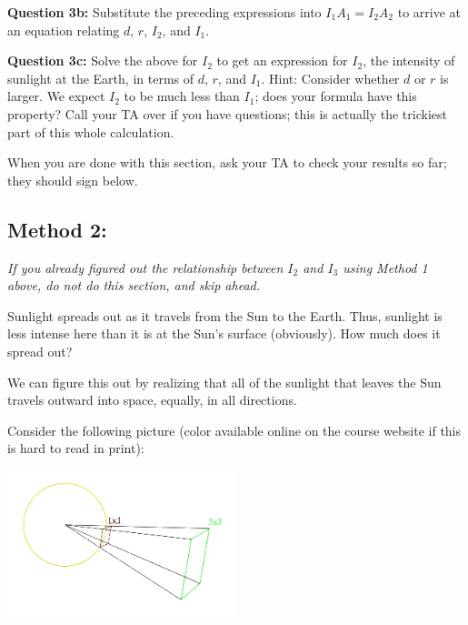 \documentclass[11pt]{article}
\def\BC{\begin{center}}
\def\EC{\end{center}}
\begin{document}
\hrulefill

\newpage
{\bf Question 3b:} Substitute the preceding expressions into $I_1 A_1 = I_2 A_2$ to arrive at an equation relating $d$, $r$,
$I_2$, and $I_1$.

\vspace*{5cm}

\hrulefill

{\bf Question 3c:} Solve the above for $I_2$ to get an expression for $I_2$, the intensity of sunlight at the Earth, in terms of
$d$, $r$, and $I_1$.
Hint: Consider whether $d$ or $r$ is larger.
We expect $I_2$ to be much less than $I_1$; does your formula have this property? Call your TA over if you have questions; this is actually the trickiest part of this whole calculation.
\vspace*{4cm}

\hrulefill




When you are done with this section, ask your TA to check your results so far; they should sign below.

\newpage

\subsection*{Method 2:}

{\color{red} \it If you already figured out the relationship between $I_2$ and $I_3$ using Method 1 above, do not do this section, and skip ahead.}

Sunlight spreads out as it travels from the Sun to the Earth. Thus, sunlight is less intense here than it is at the Sun's surface (obviously). How much does it spread out?

We can figure this out by realizing that all of the sunlight that leaves the Sun travels outward into space, equally, in all directions.

Consider the following picture (color available online on the course website if this is hard to read in print):

\BC
\includegraphics[width=0.5\textwidth]{expansion.png}
\EC
\end{document}
